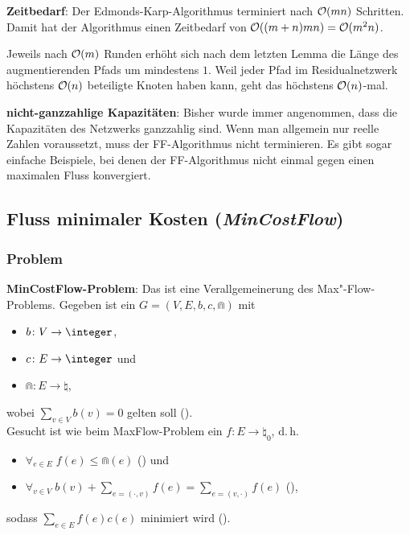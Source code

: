 \textbf{Zeitbedarf}:
Der Edmonds-Karp-Algorithmus terminiert nach $\mathcal{O}(mn)$ Schritten.\\
Damit hat der Algorithmus einen Zeitbedarf von $\mathcal{O}((m+n)mn) = \mathcal{O}(m^2 n)$.

\begin{Beweis}
    Jeweils nach $\mathcal{O}(m)$ Runden erhöht sich nach dem letzten Lemma die Länge des augmentierenden
    Pfads um mindestens $1$.
    Weil jeder Pfad im Residualnetzwerk höchstens $\mathcal{O}(n)$ beteiligte Knoten haben kann,
    geht das höchstens $\mathcal{O}(n)$-mal.
\end{Beweis}

\linie

\textbf{nicht-ganzzahlige Kapazitäten}:
Bisher wurde immer angenommen, dass die Kapazitäten des Netzwerks ganzzahlig sind.
Wenn man allgemein nur reelle Zahlen voraussetzt, muss der FF-Algorithmus nicht terminieren.
Es gibt sogar einfache Beispiele, bei denen der FF-Algorithmus nicht einmal gegen einen
maximalen Fluss konvergiert.

\pagebreak

\subsection{%
    Fluss minimaler Kosten (\emph{MinCostFlow})%
}

\subsubsection{%
    Problem%
}

\textbf{MinCostFlow-Problem}:
Das  ist eine Verallgemeinerung des Max"-Flow-Problems.
Gegeben ist ein  $G = (V, E, b, c, \Cap)$ mit
\begin{itemize}
    \item
     $b\colon V \to \integer$,

    \item
     $c\colon E \to \integer$ und

    \item
     $\Cap\colon E \to \natural$,
\end{itemize}
wobei $\sum_{v \in V} b(v) = 0$ gelten soll ().\\
Gesucht ist wie beim MaxFlow-Problem ein  $f\colon E \to \natural_0$,
d.\,h.
\begin{itemize}
    \item
    $\forall_{e \in E}\; f(e) \le \Cap(e)$
    () und

    \item
    $\forall_{v \in V}\;
    b(v) + \sum_{e = (\cdot, v)} f(e) = \sum_{e = (v, \cdot)} f(e)$
    (),
\end{itemize}
sodass $\sum_{e \in E} f(e)c(e)$ minimiert wird ().

